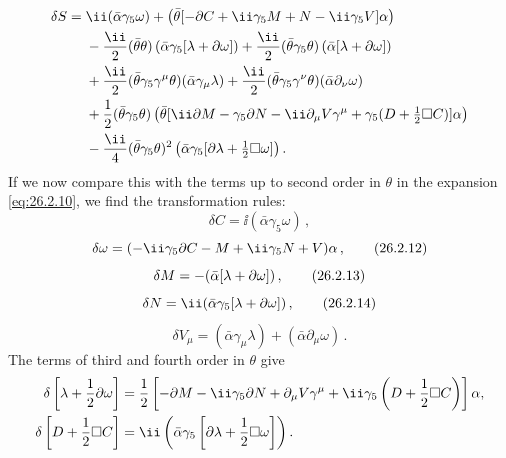 \[
  \begin{aligned}
  \delta S={}&\ii(\bar\alpha\gamma_5\omega)
  +\left(\bar\theta
    [-\sl{\partial}C+\ii\gamma_5M+N-\ii\gamma_5\sl{V}]\alpha\right)\\
  &-\frac{\ii}{2}(\bar\theta\theta)
    \left(\bar\alpha\gamma_5[\lambda+\sl{\partial}\omega]\right)
  +\frac{\ii}{2}(\bar\theta\gamma_5\theta)
    \left(\bar\alpha[\lambda+\sl{\partial}\omega]\right)\\
  &+\frac{\ii}{2}(\bar\theta\gamma_5\gamma^\mu\theta)
    (\bar\alpha\gamma_\mu\lambda)
  +\frac{\ii}{2}(\bar\theta\gamma_5\gamma^\nu\theta)
    (\bar\alpha\partial_\nu\omega)\\
  &+\frac12(\bar\theta\gamma_5\theta)
    \left(\bar\theta
      [\ii\sl{\partial}M-\gamma_5\sl{\partial}N
       -\ii\partial_\mu\sl{V}\gamma^\mu
       +\gamma_5(D+\tfrac12\Box C)]\alpha\right)\\
  &-\frac{\ii}{4}(\bar\theta\gamma_5\theta)^2
    \left(\bar\alpha\gamma_5
      [\sl{\partial}\lambda+\tfrac12\Box\omega]\right).
  \end{aligned}
\]
If we now compare this with the terms up to second order in $\theta$ in the
expansion \eqref{eq:26.2.10}, we find the transformation rules:
\begin{equation}
  \delta C=\ii(\bar\alpha\gamma_5\omega)\,,
  \tag{26.2.11}\label{eq:26.2.11}
\end{equation}
\begin{equation}
  \delta\omega
  =(-\ii\gamma_5\sl{\partial}C-M+\ii\gamma_5N+\sl{V})\alpha\,,
  \tag{26.2.12}\label{eq:26.2.12}
\end{equation}
\begin{equation}
  \delta M=-(\bar\alpha[\lambda+\sl{\partial}\omega])\,,
  \tag{26.2.13}\label{eq:26.2.13}
\end{equation}
\begin{equation}
  \delta N=\ii(\bar\alpha\gamma_5[\lambda+\sl{\partial}\omega])\,,
  \tag{26.2.14}\label{eq:26.2.14}
\end{equation}
\begin{equation}
  \delta V_\mu=(\bar\alpha\gamma_\mu\lambda)
  +(\bar\alpha\partial_\mu\omega)\,.
  \tag{26.2.15}\label{eq:26.2.15}
\end{equation}
The terms of third and fourth order in $\theta$ give
\[
  \begin{aligned}
  \delta\left[\lambda+\frac12\sl{\partial}\omega\right]
  &=\frac12\left[
    -\sl{\partial}M-\ii\gamma_5\sl{\partial}N
    +\partial_\mu\sl{V}\gamma^\mu
    +\ii\gamma_5\left(D+\frac12\Box C\right)\right]\alpha,\\
  \delta\left[D+\frac12\Box C\right]
  &=\ii\left(\bar\alpha\gamma_5
    \left[\sl{\partial}\lambda+\frac12\Box\omega\right]\right).
  \end{aligned}
\]
